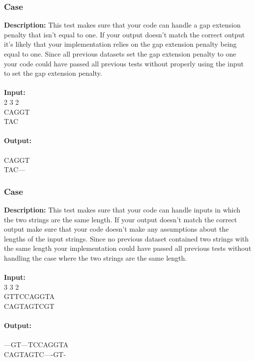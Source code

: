 \documentclass{article}
\newcommand{\code}[1]{{\fontfamily{pcr}\selectfont #1}}
\begin{document}
\subsubsection*{Case }
\hline \vspace{5}
\textbf{Description:} This test makes sure that your code can handle a gap extension penalty that isn’t equal to one. If your output doesn’t match the correct output it’s likely that your implementation relies on the gap extension penalty being equal to one. Since all previous datasets set the gap extension penalty to one your code could have passed all previous tests without properly using the input to set the gap extension penalty.\\ \\
\noindent \textbf{Input:}\\
\code{1 2 3 2\\CAGGT\\TAC}\\ \\
\noindent \textbf{Output:}\\
\code{-8\\CAGGT\\TAC---}

\subsubsection*{Case }
\hline \vspace{5}
\textbf{Description:} This test makes sure that your code can handle inputs in which the two strings are the same length. If your output doesn’t match the correct output make sure that your code doesn’t make any assumptions about the lengths of the input strings. Since no previous dataset contained two strings with the same length your implementation could have passed all previous tests without handling the case where the two strings are the same length.\\ \\
\noindent \textbf{Input:}\\
\code{2 3 3 2\\GTTCCAGGTA\\CAGTAGTCGT}\\ \\
\noindent \textbf{Output:}\\
\code{-8\\---GT---TCCAGGTA\\CAGTAGTC----GT-}
\pagebreak
\end{document}

